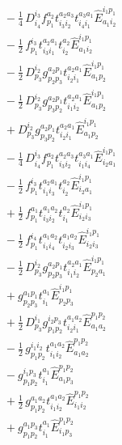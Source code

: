 \documentclass[11pt]{article}
\begin{document}
\begin{align}
&\quad - \tfrac{1}{4}\, D^{i_{3}}_{i_{4}} f^{a_{2}}_{p_{1}} t^{a_{2}a_{3}}_{i_{3}i_{2}} t^{a_{3}a_{1}}_{i_{4}i_{1}} \hat{E}^{i_{1}p_{1}}_{a_{1}i_{2}} \\
&\quad - \tfrac{1}{2}\, f^{i_{3}}_{p_{1}} t^{a_{2}a_{1}}_{i_{3}i_{1}} t^{a_{2}}_{i_{2}} \hat{E}^{i_{1}p_{1}}_{a_{1}i_{2}} \\
&\quad - \tfrac{1}{2}\, D^{i_{2}}_{p_{3}} g^{a_{2}p_{1}}_{p_{2}p_{3}} t^{a_{2}a_{1}}_{i_{2}i_{1}} \hat{E}^{i_{1}p_{1}}_{a_{1}p_{2}} \\
&\quad - \tfrac{1}{2}\, D^{i_{2}}_{p_{3}} g^{a_{2}p_{1}}_{p_{3}p_{2}} t^{a_{2}a_{1}}_{i_{1}i_{2}} \hat{E}^{i_{1}p_{1}}_{a_{1}p_{2}} \\
&\quad + D^{i_{2}}_{p_{3}} g^{a_{2}p_{1}}_{p_{3}p_{2}} t^{a_{2}a_{1}}_{i_{2}i_{1}} \hat{E}^{i_{1}p_{1}}_{a_{1}p_{2}} \\
&\quad - \tfrac{1}{4}\, D^{i_{3}}_{i_{4}} f^{a_{2}}_{p_{1}} t^{a_{2}a_{3}}_{i_{3}i_{2}} t^{a_{3}a_{1}}_{i_{1}i_{4}} \hat{E}^{i_{1}p_{1}}_{i_{2}a_{1}} \\
&\quad - \tfrac{1}{2}\, f^{i_{3}}_{p_{1}} t^{a_{2}a_{1}}_{i_{1}i_{3}} t^{a_{2}}_{i_{2}} \hat{E}^{i_{1}p_{1}}_{i_{2}a_{1}} \\
&\quad + \tfrac{1}{2}\, f^{a_{1}}_{p_{1}} t^{a_{1}a_{2}}_{i_{3}i_{2}} t^{a_{2}}_{i_{1}} \hat{E}^{i_{1}p_{1}}_{i_{2}i_{3}} \\
&\quad - \tfrac{1}{2}\, f^{i_{4}}_{p_{1}} t^{a_{1}a_{2}}_{i_{1}i_{4}} t^{a_{1}a_{2}}_{i_{2}i_{3}} \hat{E}^{i_{1}p_{1}}_{i_{2}i_{3}} \\
&\quad - \tfrac{1}{2}\, D^{i_{2}}_{p_{3}} g^{a_{2}p_{1}}_{p_{2}p_{3}} t^{a_{2}a_{1}}_{i_{1}i_{2}} \hat{E}^{i_{1}p_{1}}_{p_{2}a_{1}} \\
&\quad + g^{a_{1}p_{1}}_{p_{2}p_{3}} t^{a_{1}}_{i_{1}} \hat{E}^{i_{1}p_{1}}_{p_{2}p_{3}} \\
&\quad + \tfrac{1}{2}\, D^{i_{1}}_{p_{3}} g^{i_{2}p_{3}}_{p_{1}p_{2}} t^{a_{1}a_{2}}_{i_{2}i_{1}} \hat{E}^{p_{1}p_{2}}_{a_{1}a_{2}} \\
&\quad - \tfrac{1}{2}\, g^{i_{1}i_{2}}_{p_{1}p_{2}} t^{a_{1}a_{2}}_{i_{1}i_{2}} \hat{E}^{p_{1}p_{2}}_{a_{1}a_{2}} \\
&\quad - g^{i_{1}p_{3}}_{p_{1}p_{2}} t^{a_{1}}_{i_{1}} \hat{E}^{p_{1}p_{2}}_{a_{1}p_{3}} \\
&\quad + \tfrac{1}{2}\, g^{a_{1}a_{2}}_{p_{1}p_{2}} t^{a_{1}a_{2}}_{i_{1}i_{2}} \hat{E}^{p_{1}p_{2}}_{i_{1}i_{2}} \\
&\quad + g^{a_{1}p_{3}}_{p_{1}p_{2}} t^{a_{1}}_{i_{1}} \hat{E}^{p_{1}p_{2}}_{i_{1}p_{3}}
\end{align}
\end{document}
